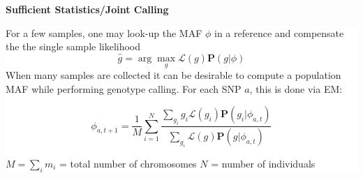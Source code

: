 \documentclass[11pt]{a0poster}
\begin{document}
{\begin{minipage}[t][2045pt][t]{\linewidth}
\begin{minipage}{0.6\linewidth}
\begin{minipage}{0.47\linewidth}
{\begin{minipage}[t]{\linewidth}
\begin{center}
\Huge \bf \color{White} Sufficient Statistics/Joint Calling
\end{center}
\vspace{17pt}
\end{minipage}
}
\colorbox{White}{
\begin{minipage}[t][520pt][t]{\linewidth}
\color{Blue}
\vspace{20pt}
\LARGE For a few samples, one may look-up the MAF $\phi$ in a reference and compensate the
the single sample likelihood
\large $$\hat{g} = \arg\max_{g} \mathcal{L}(g)\mathbf{P}(g | \phi)$$ 
\LARGE When many samples are collected it can be desirable to compute a population MAF while
performing genotype calling. For each SNP $a$, this is done via EM:

\large $$ \phi_{a,t+1} = \frac{1}{M}\sum_{i=1}^N \frac{\sum_{g_i} g_i  \mathcal{L}(g_i)\mathbf{P}(g_i | \phi_{a,t}) }{ \sum_{g_i} \mathcal{L}(g)\mathbf{P}(g | \phi_{a,t})} $$
\begin{center}
$M = \sum_i m_i$ = total number of chromosomes $N$ = number of individuals
\end{center}
\pagebreak
\end{minipage}
}
\end{minipage}

\pagebreak
\end{minipage}
\end{minipage}
}
\end{document}
